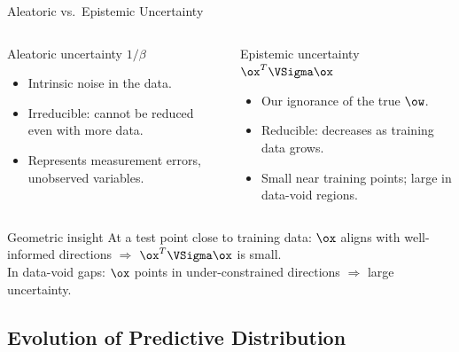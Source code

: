 \begin{frame}{Aleatoric vs.\ Epistemic Uncertainty}
  \begin{columns}[T]
  \begin{block}{Aleatoric uncertainty $1/\beta$}
    \begin{itemize}
      \item Intrinsic noise in the data.
      \item Irreducible: cannot be reduced even with more data.
      \item Represents measurement errors, unobserved variables.
    \end{itemize}
  \end{block}
  \begin{block}{Epistemic uncertainty $\ox^T\VSigma\ox$}
    \begin{itemize}
      \item Our ignorance of the true $\ow$.
      \item \alert{Reducible}: decreases as training data grows.
      \item Small near training points; large in data-void regions.
    \end{itemize}
  \end{block}
  \end{columns}
  \vspace{.4em}
  \begin{exampleblock}{Geometric insight}
    At a test point close to training data: $\ox$ aligns with well-informed directions
    $\Rightarrow$ $\ox^T\VSigma\ox$ is small.\\
    In data-void gaps: $\ox$ points in under-constrained directions $\Rightarrow$ large uncertainty.
  \end{exampleblock}
\end{frame}

\subsection{Evolution of Predictive Distribution}

